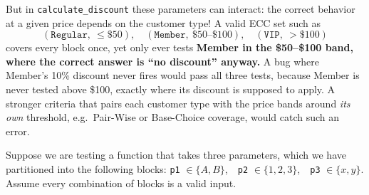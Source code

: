 \documentclass[addpoints]{exam}
\newcommand{\boxedanswer}[2]{\ifprintanswers\answer{#2}\else\makeemptybox{#1}\fi}
\begin{document}
\begin{questions}
\begin{parts}
{    \smallskip But in \texttt{calculate_discount} these
    parameters can interact: the correct behavior at a given price
    depends on the customer type! A valid ECC set such as
  \[
    (\texttt{Regular},\ \le\$50),\quad
    (\texttt{Member},\ \$50\texttt{--}\$100),\quad
    (\texttt{VIP},\ >\$100)
  \]
  covers every block once, yet only ever tests \textbf{Member in the
    \$50--\$100 band, where the correct answer is ``no discount''
    anyway.} A bug where Member's 10\% discount never fires would pass
  all three tests, because Member is never tested above \$100, exactly
  where its discount is supposed to apply. A stronger criteria that
  pairs each customer type with the price bands around \emph{its own}
  threshold, e.g.\ Pair-Wise or Base-Choice coverage, would catch such
  an error.  }
\end{parts}

\newpage

\question Suppose we are testing a function that takes three
  parameters, which we have partitioned into the following blocks:
  \texttt{p1} $\in \{A, B\}$,\ \ \texttt{p2}
  $\in \{1, 2, 3\}$,\ \ \texttt{p3} $\in \{x, y\}$. Assume
  every combination of blocks is a valid input.

\end{questions}
\end{document}

